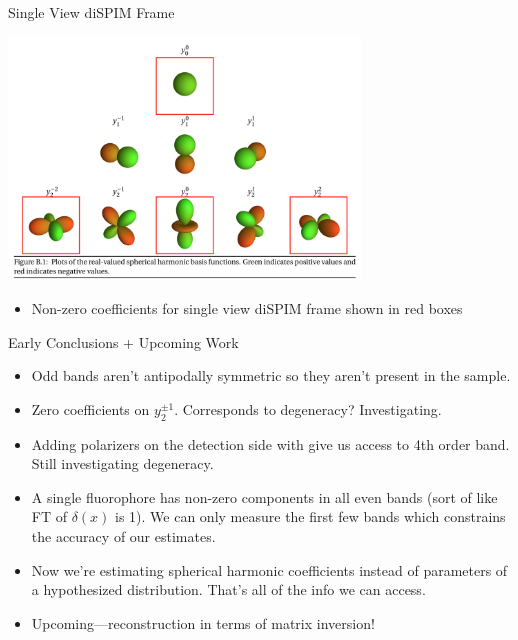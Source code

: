 \documentclass[presentation]{beamer}
\begin{document}
\begin{frame}[label=sec-7]{Single View diSPIM Frame}
\begin{center}
  \includegraphics[width=0.7\textwidth, interpolate=true]{figs/harmonics_supp.png}
\end{center}
\begin{itemize}
\item Non-zero coefficients for single view diSPIM frame shown in red boxes
\end{itemize}
\end{frame}
\begin{frame}[label=sec-8]{Early Conclusions + Upcoming Work}
\begin{itemize}
\item Odd bands aren't antipodally symmetric so they aren't present in the sample.
\item Zero coefficients on $y_2^{\pm 1}$. Corresponds to degeneracy? Investigating. 
\item Adding polarizers on the detection side with give us access to 4th order band. Still investigating degeneracy. 
\item A single fluorophore has non-zero components in all even bands (sort of like FT of $\delta(x)$ is 1). We can only measure the first few bands which constrains the accuracy of our estimates. 
\item Now we're estimating spherical harmonic coefficients instead of parameters of a hypothesized distribution. That's all of the info we can access. 
\item Upcoming---reconstruction in terms of matrix inversion! 
\end{itemize}
\end{frame}
\end{document}
